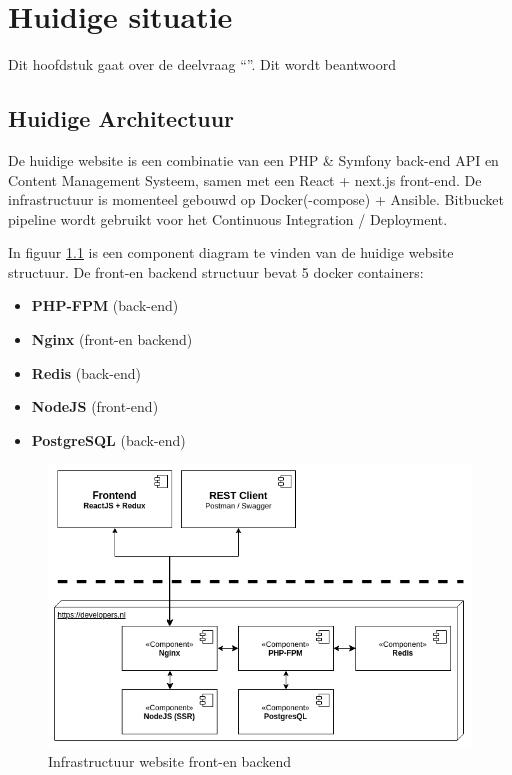 \chapter{Huidige situatie}

\label{Chapter4}

Dit hoofdstuk gaat over de deelvraag \enquote{\deelhuidig}. Dit wordt beantwoord

\section{Huidige Architectuur}
De huidige website is een combinatie van een PHP \& Symfony back-end API en Content Management Systeem, samen met een React + next.js front-end. De infrastructuur is momenteel gebouwd op Docker(-compose) + Ansible. Bitbucket pipeline wordt gebruikt voor het Continuous Integration / Deployment. 

In figuur \ref{fig:infra} is een component diagram te vinden van de huidige website structuur. De front-en backend structuur bevat 5 docker containers:
\begin{itemize}
	\item \textbf{PHP-FPM} (back-end)
	\item \textbf{Nginx} (front-en backend)
	\item \textbf{Redis} (back-end)
	\item \textbf{NodeJS} (front-end)
	\item \textbf{PostgreSQL} (back-end)
\end{itemize}

\begin{figure}
	\centering
	\includegraphics[width=13cm]{Figures/Infrastructure}
	\decoRule
	\caption[Infrastructuur]{Infrastructuur website front-en backend \parencite{Documentation}}
	\label{fig:infra}
\end{figure}


